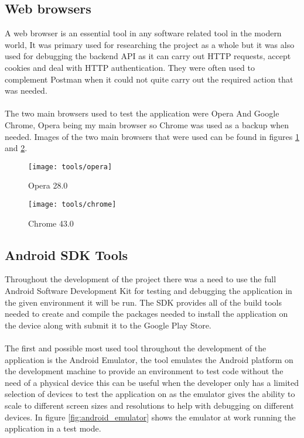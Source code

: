 \subsection*{Web browsers}

A web browser is an essential tool in any software related tool in the modern world, It was primary used for researching the project as a whole but it was also used for debugging the backend API as it can carry out HTTP requests, accept cookies and deal with HTTP authentication. They were often used to complement Postman when it could not quite carry out the required action that was needed.\\
\\
The two main browsers used to test the application were Opera And Google Chrome, Opera being my main browser so Chrome was used as a backup when needed. Images of the two main browsers that were used can be found in figures \ref{fig:opera_image} and \ref{fig:chrome_image}.

\begin{figure}[H]
    \centering
    \texttt{[image: tools/opera]}
    \caption{Opera 28.0}
    \label{fig:opera_image}
\end{figure} 

\begin{figure}[H]
    \centering
    \texttt{[image: tools/chrome]}
    \caption{Chrome 43.0}
    \label{fig:chrome_image}
\end{figure} 

\subsection*{Android SDK Tools}

Throughout the development of the project there was a need to use the full Android Software Development Kit for testing and debugging the application in the given environment it will be run. The SDK provides all of the build tools needed to create and compile the packages needed to install the application on the device along with submit it to the Google Play Store.\\
\\
The first and possible most used tool throughout the development of the application is the Android Emulator, the tool emulates the Android platform on the development machine to provide an environment to test code without the need of a physical device this can be useful when the developer only has a limited selection of devices to test the application on as the emulator gives the ability to scale to different screen sizes and resolutions to help with debugging on different devices. In figure \ref{fig:android_emulator} shows the emulator at work running the application in a test mode.


